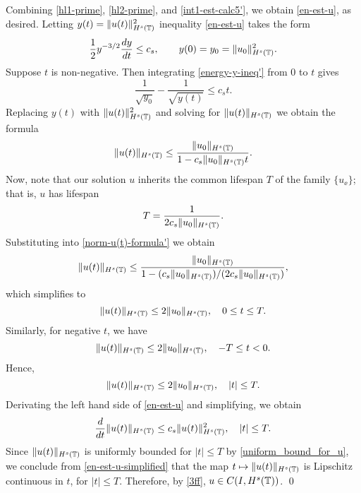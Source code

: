 %
%
%
Combining \eqref{hl1-prime}, \eqref{hl2-prime},
and \eqref{int1-est-calc5'}, we obtain \eqref{en-est-u}, as desired.
Letting  $y(t)=  \|u(t)\|_{H^s(\mathbb{T})}^2$ inequality \eqref{en-est-u}
takes the form
%
\begin{equation} 
\label{energy-y-ineq'}
\frac 12
y^{-3/2}\frac{dy}{dt}
\le
c_s,
\qquad
y(0)=y_0=  \|u_0\|_{H^s(\mathbb{T})}^2.
\end{equation}
%
Suppose $t$ is non-negative. Then integrating  \eqref{energy-y-ineq'}
from  0 to $t$ gives
%
\begin{equation*} 
\frac{1}{\sqrt{y_0}}  - \frac{1}{\sqrt{y(t)}} 
\le 
c_s t.
\end{equation*}
%
%
Replacing $y(t)$ with   $\|u(t)\|_{H^s(\mathbb{T})}^2$  and solving for  $\|u(t)\|_{H^s(\mathbb{T})}$
we obtain the formula
%
\begin{equation} 
\label{norm-u(t)-formula'}
\|u(t)\|_{H^s(\mathbb{T})}
\le
\frac{\|u_0\|_{H^s(\mathbb{T})}}{1-c_s\|u_0\|_{H^s(\mathbb{T})} t}.
\end{equation}
%
Now, note that our solution $u$ inherits the common lifespan $T$ of the family
$\{u_\ee\}$; that is, $u$ has lifespan
\begin{equation*}
T
=
\frac{1}{2 c_s \|u_0\|_{H^s(\mathbb{T})}}.
\end{equation*}
Substituting into \eqref{norm-u(t)-formula'} we obtain	
%
\begin{equation*} 
\label{u(t)-u(0)-bound'}
\|u(t)\|_{H^s(\mathbb{T})}
\le
\frac{\|u_0\|_{H^s(\mathbb{T})}}{1-(c_s\|u_0\|_{H^s(\mathbb{T})})/(2 c_s \|u_0\|_{H^s(\mathbb{T})})},
\end{equation*}
%
which simplifies to 
%
\begin{equation*}
\|u(t)\|_{H^s(\mathbb{T})}
\le
2 \|u_0\|_{H^s(\mathbb{T})},
\quad 
0\le t \le T.
\end{equation*}
Similarly, for negative $t$, we have
\begin{equation*}
\|u(t)\|_{H^s(\mathbb{T})}
\le
2 \|u_0\|_{H^s(\mathbb{T})},
\quad 
-T \le t < 0.
\end{equation*}
Hence,
\begin{equation}
\label{uniform_bound_for_u}
\|u(t)\|_{H^s(\mathbb{T})}
\le
2 \|u_0\|_{H^s(\mathbb{T})},
\quad 
|t| \le T.
\end{equation}
%
Derivating the left hand side of \eqref{en-est-u} and simplifying, we obtain
\begin{equation}
\label{en-est-u-simplified}
\frac{d}{dt} \|u(t)\|_{H^s(\mathbb{T})} \le c_s \|u(t)\|_{H^s(\mathbb{T})}^2, \quad |t| \le T.
\end{equation}
Since $\|u(t)\|_{H^s(\mathbb{T})}$
is uniformly bounded for $|t| \le T$ by
\eqref{uniform_bound_for_u}, we conclude from
\eqref{en-est-u-simplified} that the map $t \mapsto
\|u(t)\|_{H^s(\mathbb{T})}$ is Lipschitz continuous in $t$, for $|t| \le T$.
Therefore, by \eqref{3ff}, $u \in C(I, H^s(\mathbb{T}))$. \qed
%
%
%
%
%

